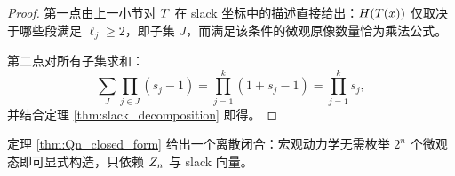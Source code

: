 \begin{proof}
第一点由上一小节对 $T$ 在 slack 坐标中的描述直接给出：$H(T(x))$ 仅取决于哪些段满足 $\ell_j\ge 2$，即子集 $J$，而满足该条件的微观原像数量恰为乘法公式。

第二点对所有子集求和：
$$
\sum_{J}\prod_{j\in J}(s_j-1)=\prod_{j=1}^k(1+s_j-1)=\prod_{j=1}^k s_j,
$$
并结合定理 \ref{thm:slack_decomposition} 即得。
\end{proof}

定理 \ref{thm:Qn_closed_form} 给出一个离散闭合：宏观动力学无需枚举 $2^n$ 个微观态即可显式构造，只依赖 $Z_n$ 与 slack 向量。

